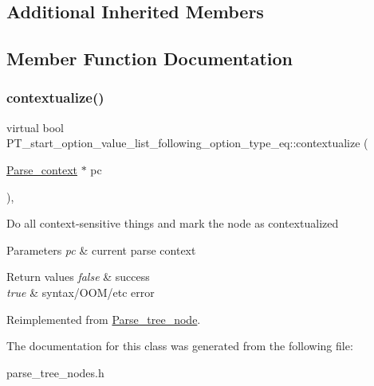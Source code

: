 \subsection*{Additional Inherited Members}


\subsection{Member Function Documentation}
\mbox{\label{classPT__start__option__value__list__following__option__type__eq_a748b216be3de04a1f758284578b630c2}} 
\subsubsection{\texorpdfstring{contextualize()}{contextualize()}}
{\footnotesize\ttfamily virtual bool P\+T\+\_\+start\+\_\+option\+\_\+value\+\_\+list\+\_\+following\+\_\+option\+\_\+type\+\_\+eq\+::contextualize (\begin{DoxyParamCaption}\item[{\mbox{\hyperlink{structParse__context}{Parse\+\_\+context}} $\ast$}]{pc }\end{DoxyParamCaption})\hspace{0.3cm}{\ttfamily [inline]}, {\ttfamily [virtual]}}

Do all context-\/sensitive things and mark the node as contextualized


\begin{DoxyParams}{Parameters}
{\em pc} & current parse context\\
\hline
\end{DoxyParams}

\begin{DoxyRetVals}{Return values}
{\em false} & success \\
\hline
{\em true} & syntax/\+O\+O\+M/etc error \\
\hline
\end{DoxyRetVals}


Reimplemented from \mbox{\hyperlink{classParse__tree__node_a22d93524a537d0df652d7efa144f23da}{Parse\+\_\+tree\+\_\+node}}.



The documentation for this class was generated from the following file\+:\begin{DoxyCompactItemize}
\item 
parse\+\_\+tree\+\_\+nodes.\+h\end{DoxyCompactItemize}
